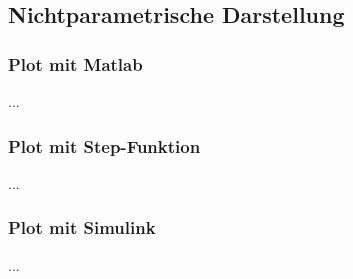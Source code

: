 \documentclass[
  ngerman
  ,12pt
  ,pdftex
]{article}
\begin{document}
\subsection{Nichtparametrische Darstellung}
\subsubsection{Plot mit Matlab}

...
\subsubsection{Plot mit Step-Funktion}
...
\subsubsection{Plot mit Simulink}
...
\end{document}
